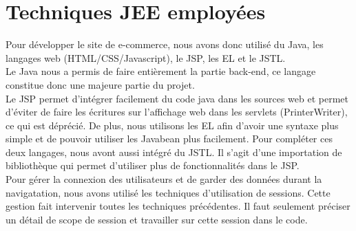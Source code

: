 \section{Techniques JEE employées}

Pour développer le site de e-commerce, nous avons donc utilisé du Java, les 
langages web (HTML/CSS/Javascript), le JSP, les EL et le JSTL. \\

Le Java nous a permis de faire entièrement la partie back-end, ce langage 
constitue donc une majeure partie du projet. \\

Le JSP permet d'intégrer facilement du code java dans les sources web et 
permet d'éviter de faire les écritures sur l'affichage web dans les servlets 
(PrinterWriter), ce qui est déprécié. De plus, nous utilisons les EL afin 
d'avoir une syntaxe plus simple et de pouvoir utiliser les Javabean plus 
facilement. Pour compléter ces deux langages, nous avont aussi intégré du JSTL. 
Il s'agit d'une importation de bibliothèque qui permet d'utiliser plus de 
fonctionnalités dans le JSP. \\

Pour gérer la connexion des utilisateurs et de garder des données durant la 
navigatation, nous avons utilisé les techniques d'utilisation de sessions. 
Cette gestion fait intervenir toutes les techniques précédentes. Il faut 
seulement préciser un détail de scope de session et travailler sur cette 
session dans le code.
